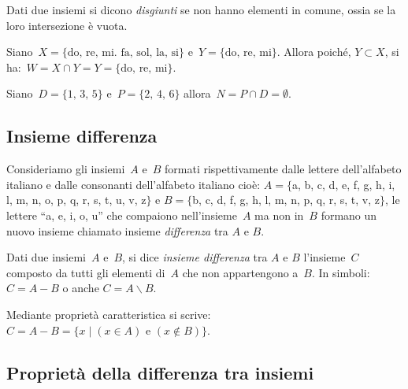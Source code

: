 \begin{definizione}
Dati due insiemi si dicono \emph{disgiunti} se non hanno elementi in comune, ossia se la loro intersezione è vuota.
\end{definizione}

\begin{exrig}
 \begin{esempio}
Siano~$X=\{\text{do, re, mi. fa, sol, la, si}\}$
e~$Y=\{\text{do, re, mi}\}$. Allora poiché, 
$Y\subset X$, si ha:~$W=X\cap Y=Y=\{\text{do, re, mi}\}$.
 \end{esempio}

 \begin{esempio}
Siano~$D=\{\text{1, 3, 5}\}$ e~$P=\{\text{2, 4, 6}\}$ allora~$N=P\cap D=\emptyset$.
\begin{center}
 
\end{center}
 \end{esempio}
\end{exrig}

\ovalbox{\risolvii \ref{ese:7.16}, \ref{ese:7.17}, \ref{ese:7.18}, \ref{ese:7.19}}

\subsection{Insieme differenza}

Consideriamo gli insiemi~$A$ e~$B$ formati rispettivamente
dalle lettere dell'alfabeto italiano e dalle
consonanti dell'alfabeto italiano cioè:
$A=\{$a, b, c, d, e, f, g, h, i, l, m, n, o, p, q, r, s, t, u, v, z$\}$ e
$B=\{$b, c, d, f, g, h, l, m, n, p, q, r, s, t, v, z$\}$, le lettere ``a, e, i, o, u'' che compaiono
nell'insieme~$A$ ma non in~$B$ formano un nuovo insieme chiamato insieme \emph{differenza} tra $A$ e $B$.

\begin{definizione}
 Dati due insiemi~$A$ e~$B$, si dice \emph{insieme differenza} tra $A$ e $B$ l'insieme~$C$ composto da tutti gli elementi
di~$A$ che non appartengono a~$B$. In simboli:~$C=A-B$ o anche $C=A \backslash B$.
\end{definizione}

\begin{center}

\end{center}
Mediante proprietà caratteristica si scrive:~$C=A-B=\{x\mid (x\in A)\text{ e }(x\notin B)\}$.

\subsection{Proprietà della differenza tra insiemi}

